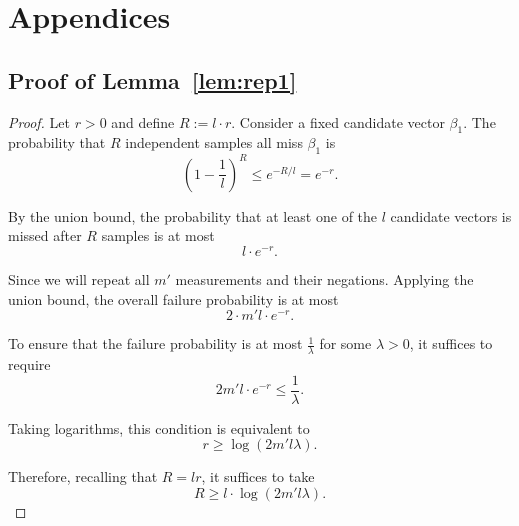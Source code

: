 \documentclass{article}
\newtheorem{lemma}{Lemma}[section]
\begin{document}





\section{Appendices}
\subsection{Proof of Lemma~\ref{lem:rep1}}
\begin{proof}
    Let $r > 0$ and define $R := l \cdot r$. Consider a fixed candidate vector $\beta_1$. The probability that $R$ independent samples all miss $\beta_1$ is
\[
\left(1 - \frac{1}{l}\right)^R \leq e^{-R/l} = e^{-r}.
\]

By the union bound, the probability that at least one of the $l$ candidate vectors is missed after $R$ samples is at most
\[
l \cdot e^{-r}.
\]

\medskip

Since we will repeat all $m'$ measurements and their negations. Applying the union bound, the overall failure probability is at most
\[
2\cdot m' l \cdot e^{-r}.
\]

\medskip

To ensure that the failure probability is at most $\frac{1}{\lambda}$ for some $\lambda > 0$, it suffices to require
\[
2m' l \cdot e^{-r} \leq \frac{1}{\lambda}.
\]

Taking logarithms, this condition is equivalent to
\[
r \geq \log(2m' l \lambda).
\]

Therefore, recalling that $R = l r$, it suffices to take
\[
R \geq l \cdot \log(2m' l \lambda).
\]
\end{proof}
\end{document}
